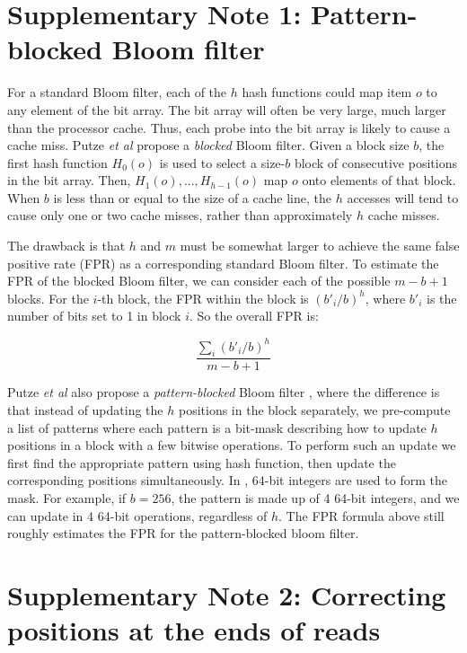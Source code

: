 \documentclass[10pt]{article}
\begin{document}

\section*{Supplementary Note 1: Pattern-blocked Bloom filter}

For a standard Bloom filter, each of the $h$ hash functions could map item $o$ to any element of the bit array. The bit array will often be very large, much larger than the processor cache.  Thus, each probe into the bit array is likely to cause a cache miss. Putze \emph{et al} \cite{Putze:2010:CHS:1498698.1594230} propose a \emph{blocked} Bloom filter. Given a block size $b$, the first hash function $H_0(o)$ is used to select a size-$b$ block of consecutive positions in the bit array.  Then, $H_1(o),...,H_{h-1}(o)$ map $o$ onto elements of that block. When $b$ is less than or equal to the size of a cache line, the $h$ accesses will tend to cause only one or two cache misses, rather than approximately $h$ cache misses.

The drawback is that $h$ and $m$ must be somewhat larger to achieve the same false positive rate (FPR) as a corresponding standard Bloom filter.  To estimate the FPR of the blocked Bloom filter, we can consider each of the possible $m-b+1$ blocks. For the $i$-th block, the FPR within the block is $(b'_i/b)^h$, where $b'_i$ is the number of bits set to 1 in block $i$. So the overall FPR is:

$$\frac{\sum_i (b'_i/b)^h}{m-b+1}$$

Putze \emph{et al} also propose a \emph{pattern-blocked} Bloom filter \cite{Putze:2010:CHS:1498698.1594230}, where the difference is that instead of updating the $h$ positions in the block separately, we pre-compute a list of patterns where each pattern is a bit-mask describing how to update $h$ positions in a block with a few bitwise operations. To perform such an update we first find the appropriate pattern using hash function, then update the corresponding positions simultaneously. In \tool, 64-bit integers are used to form the mask. For example, if $b=256$, the pattern is made up of 4 64-bit integers, and we can update in 4 64-bit operations, regardless of $h$. The FPR formula above still roughly estimates the FPR for the pattern-blocked bloom filter.

\section*{Supplementary Note 2: Correcting positions at the ends of reads}
\end{document}
